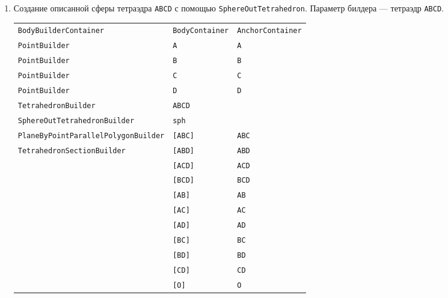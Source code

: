 \documentclass[fontsize=10px, a4paper, openany]{scrbook}
\begin{document}
\begin{enumerate}
\pagebreak

\item Создание описанной сферы тетраэдра \texttt{ABCD} с помощью \texttt{SphereOutTetrahedron}. Параметр билдера --- тетраэдр \texttt{ABCD}.

\begin{table}[h!]
\centering
\begin{tabular}{lll}
\texttt{BodyBuilderContainer}                 & \texttt{BodyContainer} & \texttt{AnchorContainer} \\
\texttt{PointBuilder} & \texttt{A}    & \texttt{A}      \\
\texttt{PointBuilder} & \texttt{B}    & \texttt{B}      \\
\texttt{PointBuilder} & \texttt{C}    & \texttt{C}      \\
\texttt{PointBuilder} & \texttt{D}    & \texttt{D}      \\
\texttt{TetrahedronBuilder} & \texttt{ABCD} & \\
\cellcolor[HTML]{68CBD0}\texttt{SphereOutTetrahedronBuilder} & \cellcolor[HTML]{68CBD0}\texttt{sph}              & \\
\texttt{PlaneByPointParallelPolygonBuilder}   & \texttt{[ABC]} & \texttt{ABC} \\
\texttt{TetrahedronSectionBuilder}            & \texttt{[ABD]} & \texttt{ABD} \\
 & \texttt{[ACD]} & \texttt{ACD} \\
 & \texttt{[BCD]} & \texttt{BCD} \\
 & \texttt{[AB]} & \texttt{AB} \\
 & \texttt{[AC]} & \texttt{AC} \\
 & \texttt{[AD]} & \texttt{AD} \\
 & \texttt{[BC]} & \texttt{BC} \\
 & \texttt{[BD]} & \texttt{BD} \\
 & \texttt{[CD]} & \texttt{CD} \\
 & \cellcolor[HTML]{68CBD0}\texttt{[O]}  & \cellcolor[HTML]{68CBD0}\texttt{O} \\
\end{tabular}
\end{table}

\begin{center}
\end{center}


\end{enumerate}
\end{document}
